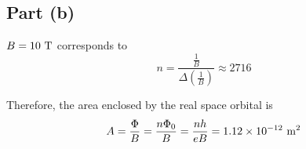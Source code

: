 \documentclass{article}
\begin{document}
\subsection{Part (b)}
$B=10\textup{ T}$ corresponds to
\begin{equation*}
n=\frac{\frac{1}{B}}{\Delta\left(\frac{1}{B}\right)}\approx 2716
\end{equation*}

Therefore, the area enclosed by the real space orbital is
\begin{equation*}
A=\frac{\Phi}{B}=\frac{n\Phi_0}{B}=\frac{nh}{eB}=1.12\times 10^{-12}\textup{ m}^2
\end{equation*}
\end{document}
